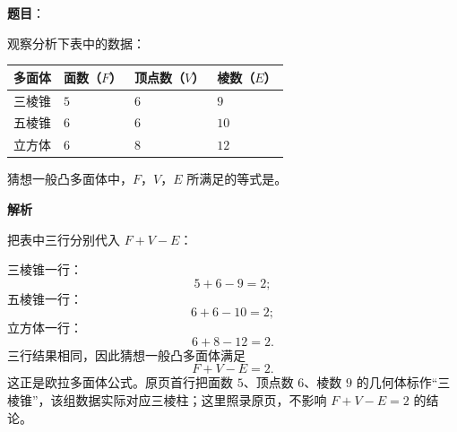 \begin{answer}

\textbf{题目}：

观察分析下表中的数据：

\begin{center}
\begin{tabular}{llll}
\toprule
多面体 & 面数（$F$） & 顶点数（$V$） & 棱数（$E$） \\
\midrule
三棱锥 & $5$ & $6$ & $9$ \\
五棱锥 & $6$ & $6$ & $10$ \\
立方体 & $6$ & $8$ & $12$ \\
\bottomrule
\end{tabular}
\end{center}

猜想一般凸多面体中，$F$，$V$，$E$ 所满足的等式是\gkblank{}。

\textbf{解析}

把表中三行分别代入 $F+V-E$：

三棱锥一行：
\nopagebreak[4]
\[5+6-9=2;\]
五棱锥一行：
\nopagebreak[4]
\[6+6-10=2;\]
立方体一行：
\nopagebreak[4]
\[6+8-12=2.\]
三行结果相同，因此猜想一般凸多面体满足
\nopagebreak[4]
\[F+V-E=2.\]
这正是欧拉多面体公式。原页首行把面数 $5$、顶点数 $6$、棱数 $9$ 的几何体标作“三棱锥”，该组数据实际对应三棱柱；这里照录原页，不影响 $F+V-E=2$ 的结论。


\end{answer}

